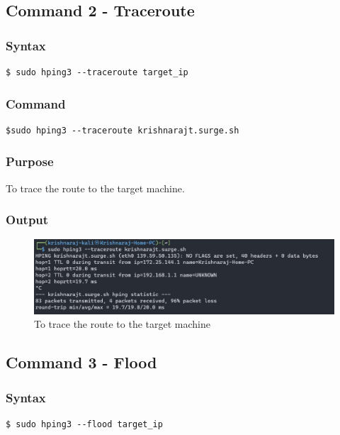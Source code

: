 \documentclass[11pt]{article}
\begin{document}
\subsection{Command 2 - Traceroute}

\subsubsection*{Syntax}
\begin{verbatim}
$ sudo hping3 --traceroute target_ip
\end{verbatim}

\subsubsection*{Command}
\begin{verbatim}
$sudo hping3 --traceroute krishnarajt.surge.sh
\end{verbatim}


\subsubsection*{Purpose}
To trace the route to the target machine.

\subsubsection*{Output}
\begin{figure}[H]
    \centering
    \includegraphics[width=1.0\textwidth]{hping/hping trace.jpg}
    \caption{To trace the route to the target machine}
    \label{fig:2}
\end{figure}

\subsection{Command 3 - Flood}

\subsubsection*{Syntax}
\begin{verbatim}
$ sudo hping3 --flood target_ip
\end{verbatim}
\end{document}
